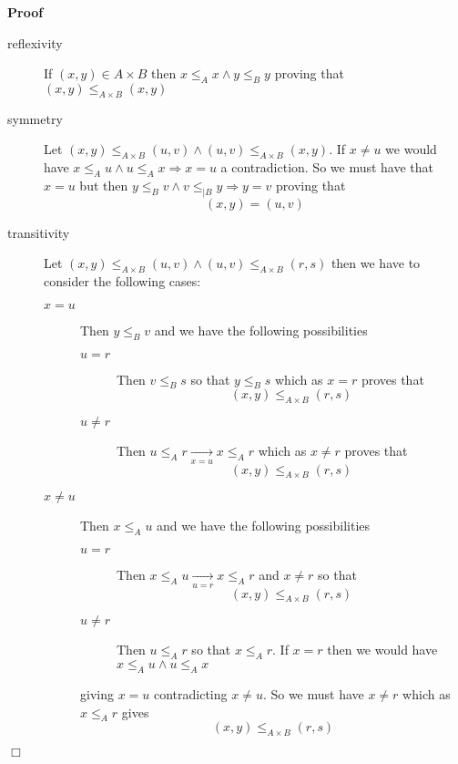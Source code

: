 \documentclass{book}
\newcommand{\Rightarrowlim}{\mathop{\rightarrow}\limits}
\newenvironment{proof}{\noindent\textbf{Proof\ }}{\hspace*{\fill}$\Box$\medskip}
\begin{document}
\begin{proof}
  
  \begin{description}
    \item[reflexivity] If $(x, y) \in A \times B$ then $x \leqslant_A x \wedge
    y \leqslant_B y$ proving that $(x, y) \leqslant_{A \times B} (x, y)$
    
    \item[symmetry] Let $(x, y) \leqslant_{A \times B} (u, v) \wedge (u, v)
    \leqslant_{A \times B} (x, y)$. If $x \neq u$ we would have $x \leqslant_A
    u \wedge u \leqslant_A x \Rightarrow x = u$ a contradiction. So we must
    have that $x = u$ but then $y \leqslant_B v \wedge v \leqslant_{|B} y
    \Rightarrow y = v$ proving that
    \[ (x, y) = (u, v) \]
    \item[transitivity] Let $(x, y) \leqslant_{A \times B} (u, v) \wedge (u,
    v) \leqslant_{A \times B} (r, s)$ then we have to consider the following
    cases:
    \begin{description}
      \item[$x = u$]  Then $y \leqslant_B v$ and we have the following
      possibilities
      \begin{description}
        \item[$u = r$] Then $v \leqslant_B s$ so that $y \leqslant_B s$ which
        as $x = r$ proves that
        \[ (x, y) \leqslant_{A \times B} (r, s) \]
        \item[$u \neq r$] Then $u \leqslant_A r \Rightarrowlim_{x = u} x
        \leqslant_A r$ which as $x \neq r$ proves that
        \[ (x, y) \leqslant_{A \times B} (r, s) \]
      \end{description}
      \item[$x \neq u$] Then $x \leqslant_A u$ and we have the following
      possibilities
      \begin{description}
        \item[$u = r$] Then $x \leqslant_A u \Rightarrowlim_{u = r} x
        \leqslant_A r$ and $x \neq r$ so that
        \[ (x, y) \leqslant_{A \times B} (r, s) \]
        \item[$u \neq r$] Then $u \leqslant_A r$ so that $x \leqslant_A r$. If
        $x = r$ then we would have $x \leqslant_A u \wedge u \leqslant_A x$
      \end{description}
      giving $x = u$ contradicting $x \neq u$. So we must have $x \neq r$
      which as $x \leqslant_A r$ gives
      \[ (x, y) \leqslant_{A \times B} (r, s) \]
    \end{description}
  \end{description}
\end{proof}
\end{document}
